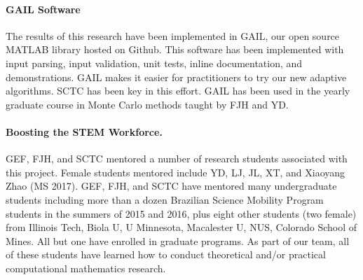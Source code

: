 \documentclass[11pt]{NSFamsart}
\newcommand{\GAIL}{GAIL\xspace}
\newcommand{\MATLAB}{MATLAB\xspace}
\newcommand{\Rlang}{R\xspace}
\begin{document}
\paragraph*{\GAIL Software} The results of this research have been implemented in 
\GAIL, our open source \MATLAB library hosted on
Github. This software 
has been implemented with input parsing, input validation, unit tests, inline documentation, and 
demonstrations.  \GAIL makes it easier for practitioners to try our new adaptive algorithms.  SCTC has been key in this effort.  \GAIL has been used in the yearly graduate course in Monte Carlo methods taught by FJH and YD.  

\paragraph*{Boosting the STEM Workforce.} GEF, FJH, and SCTC mentored a number of 
research students associated with this project.  Female students mentored include YD, LJ, JL, XT, and Xiaoyang Zhao (MS 2017).   GEF, FJH,  and SCTC have mentored many undergraduate students including more than a dozen 
Brazilian Science Mobility Program students in the summers of 2015 and 2016, plus eight other students (two female) from Illinois Tech, Biola U, U Minnesota, Macalester U, NUS, Colorado School of Mines.  All but one have enrolled in graduate programs.   As part of our team, all of
these students have learned how to conduct theoretical and/or practical computational mathematics research.


\newpage
\clearpage
\setcounter{page}{1}




{\renewcommand\addcontentsline[3]{} 
\renewcommand{\refname}{{\Large\textbf{References Cited}}}                   %
\renewcommand{\bibliofont}{\normalsize}

}
\end{document}
